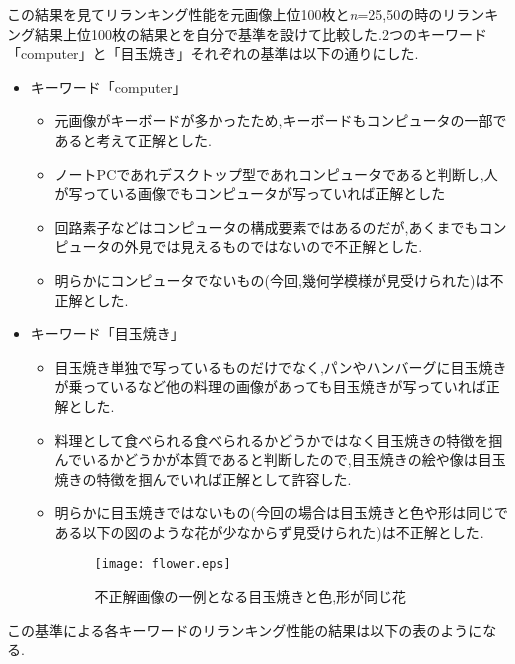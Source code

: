 \documentclass[11pt,a4j]{jreport}
\begin{document}
  この結果を見てリランキング性能を元画像上位100枚と\textit{n}=25,50の時のリランキング結果上位100枚の結果とを自分で基準を設けて比較した.2つのキーワード「computer」と「目玉焼き」それぞれの基準は以下の通りにした.
\begin{itemize}
  \item キーワード「computer」
    \begin{itemize}  
    \item  元画像がキーボードが多かったため,キーボードもコンピュータの一部であると考えて正解とした.
    \item  ノートPCであれデスクトップ型であれコンピュータであると判断し,人が写っている画像でもコンピュータが写っていれば正解とした
    \item  回路素子などはコンピュータの構成要素ではあるのだが,あくまでもコンピュータの外見では見えるものではないので不正解とした.
    \item 明らかにコンピュータでないもの(今回,幾何学模様が見受けられた)は不正解とした.
     \end{itemize}
\end{itemize} 
\newpage
\begin{itemize}
  \item キーワード「目玉焼き」
  \begin{itemize}
  \item 目玉焼き単独で写っているものだけでなく,パンやハンバーグに目玉焼きが乗っているなど他の料理の画像があっても目玉焼きが写っていれば正解とした.
  \item 料理として食べられる食べられるかどうかではなく目玉焼きの特徴を掴んでいるかどうかが本質であると判断したので,目玉焼きの絵や像は目玉焼きの特徴を掴んでいれば正解として許容した.
  \item 明らかに目玉焼きではないもの(今回の場合は目玉焼きと色や形は同じである以下の図のような花が少なからず見受けられた)は不正解とした.
    \begin{figure}[htbp]
      \begin{center}
        \texttt{[image: flower.eps]}
        \caption{不正解画像の一例となる目玉焼きと色,形が同じ花}
      \end{center}
    \end{figure}
  \end{itemize}
\end{itemize}

この基準による各キーワードのリランキング性能の結果は以下の表のようになる.
\end{document}
